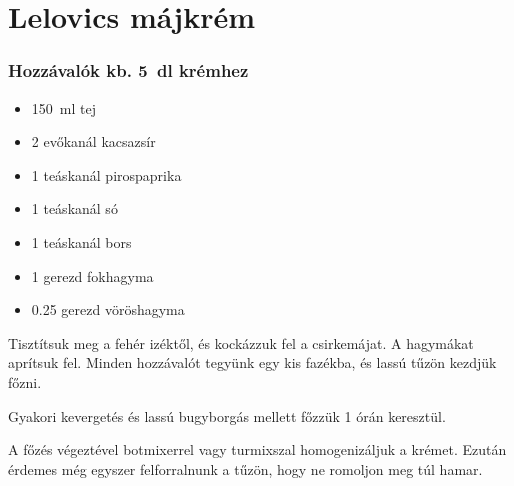 \newpage
\section{Lelovics májkrém} \label{sec:majkrem}

\subsubsection*{Hozzávalók kb. \qty{5}{\deci\l} krémhez}
\begin{itemize}
    \item \qty{150}{\ml} tej
    \item \num{2} evőkanál kacsazsír
    \item \num{1} teáskanál pirospaprika
    \item \num{1} teáskanál só
    \item \num{1} teáskanál bors
    \item \num{1} gerezd fokhagyma
    \item \num{0.25} gerezd vöröshagyma
\end{itemize}

Tisztítsuk meg a fehér izéktől, és kockázzuk fel a csirkemájat. A hagymákat aprítsuk fel. Minden hozzávalót tegyünk egy kis fazékba, és lassú tűzön kezdjük főzni.

Gyakori kevergetés és lassú bugyborgás mellett főzzük 1 órán keresztül.

A főzés végeztével botmixerrel vagy turmixszal homogenizáljuk a krémet. Ezután érdemes még egyszer felforralnunk a tűzön, hogy ne romoljon meg túl hamar.
